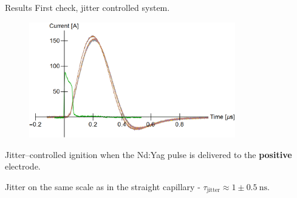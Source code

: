 \documentclass[]{beamer}
\begin{document}
  \begin{frame}{Results}
    First check, jitter controlled system.
    \begin{figure}
      \includegraphics[width=0.8\textwidth]{figures/results/2stageCapillary/low_jitter_curved_capillary.png}
    \end{figure}
    Jitter--controlled ignition when the Nd:Yag pulse is delivered to the \textbf{positive} electrode.

    Jitter on the same scale as in the straight capillary - $\tau_\text{jitter}\approx 1\pm \SI{0.5}{\ns}$.
  \end{frame}
\end{document}
